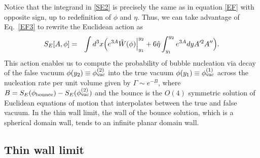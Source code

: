 \documentclass[aps,12pt, a4paper,nofootinbib]{revtex4}
\begin{document}
{Notice that the integrand in \eqref{SE2} is precisely the same as in equation \eqref{EF} with opposite sign, up to redefinition of $\phi$ and $\eta$. Thus, we can take advantage of Eq.~\eqref{EF3} to rewrite the Euclidean action as
\begin{eqnarray}\label{SE-3}
S_E[A,\phi]&=&\int d^{3}x\Big(e^{3A}\tilde{W}({\phi})\Big{|}_{y_1}^{y_2}+6\hat{\eta}\int_{y_1}^{y_2}{e^{3A}dyA'^{2}A''} \Big).
\end{eqnarray}
This action enables us to compute the probability of bubble nucleation via decay of the false vacuum $\phi(y_2)\equiv\phi^{(2)}_{\rm vac}$ into the true vacuum $\phi(y_1)\equiv\phi^{(1)}_{\rm vac}$ across the nucleation rate per unit volume given by $\Gamma\sim e^{-B}$, where $B=S_E(\phi_{\rm bounce})-S_E(\phi^{(2)}_{\rm vac})$ and the bounce is the $O(4)$ symmetric solution of Euclidean equations of motion that interpolates between the true and false vacuum. In the thin wall limit, the wall of the bounce solution, which is a spherical domain wall, tends to an infinite planar domain wall. 

\subsection{Thin wall limit}

}
\end{document}
